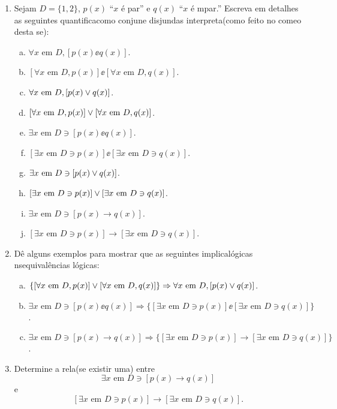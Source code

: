 \begin{enumerate}[{\bf 1.}]
\item Sejam $D=\{1,2\}$, $p(x)$ ``$x$ \'e par'' e $q(x)$ ``$x$ \'e \ih mpar.'' Escreva em detalhes as seguintes quantifica\coes como conjun\coes e disjun\coes  das interpreta\coes (como feito no come\cc o desta se\caoi):
\begin{enumerate}[a)]
\item $\forall x \textrm{ em } D, [p(x)\ee q(x)]$.
\item $[\forall x \textrm{ em } D, p(x)]\ee[\forall x \textrm{ em } D, q(x)]$.
\item $\forall x \textrm{ em } D, [p(x)\vee q(x)]$.
\item $[\forall x \textrm{ em } D, p(x)]\vee[\forall x \textrm{ em } D, q(x)]$.
\item $\exists x \textrm{ em } D \ni [p(x)\ee q(x)]$.
\item $[\exists x \textrm{ em } D \ni p(x)]\ee[\exists x \textrm{ em } D \ni q(x)]$.
\item $\exists x \textrm{ em } D \ni [p(x)\vee q(x)]$.
\item $[\exists x \textrm{ em } D \ni p(x)]\vee[\exists x \textrm{ em } D \ni q(x)]$.
\item $\exists x \textrm{ em } D \ni [p(x)\to q(x)]$.
\item $[\exists x \textrm{ em } D \ni p(x)]\to[\exists x \textrm{ em } D \ni q(x)]$.
\end{enumerate}

\item D\^e alguns exemplos para mostrar que as seguintes implica\coes l\'ogicas n\ao s\ao equival\^encias l\'ogicas:
\begin{enumerate}[a)]
\item $\{[\forall x \textrm{ em } D, p(x)]\vee[\forall x \textrm{ em } D, q(x)]\}\Rightarrow \forall x \textrm{ em } D, [p(x)\vee q(x)]$.
\item $\exists x \textrm{ em } D \ni [p(x)\ee q(x)]\Rightarrow\{[\exists x \textrm{ em } D \ni p(x)]\ee[\exists x \textrm{ em } D \ni q(x)]\}$.
\item $\exists x \textrm{ em } D \ni [p(x)\to q(x)]\Rightarrow\{[\exists x \textrm{ em } D \ni p(x)]\to[\exists x \textrm{ em } D \ni q(x)]\}$.
\end{enumerate}

\item Determine a rela\cao (se existir uma) entre
\[
\exists x \textrm{ em } D \ni [p(x)\to q(x)]
\]
e
\[
[\exists x \textrm{ em } D \ni p(x)]\to[\exists x \textrm{ em } D \ni q(x)].
\]


\end{enumerate}
